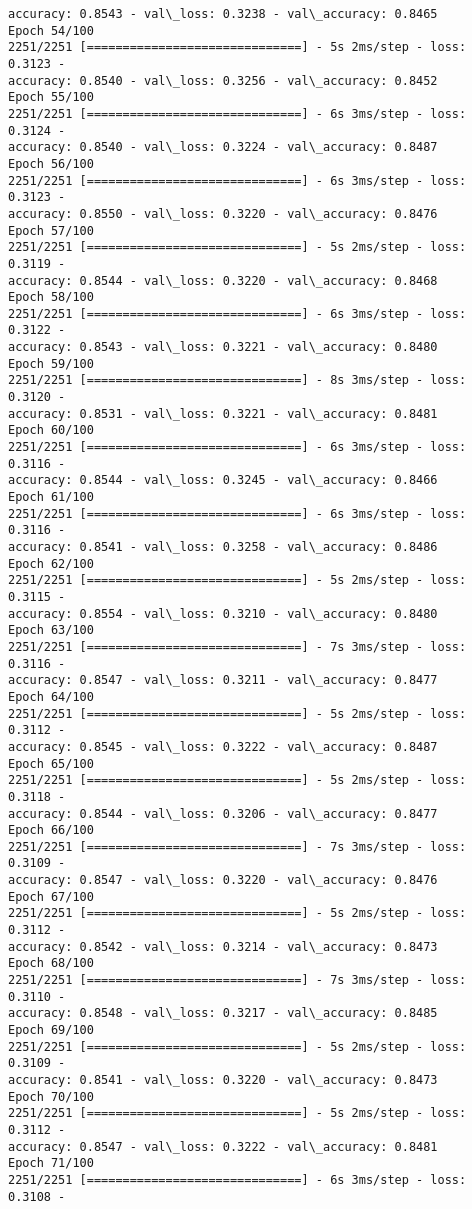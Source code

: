 \documentclass[11pt]{article}
\begin{document}
\begin{Verbatim}[commandchars=\\\{\}]
accuracy: 0.8543 - val\_loss: 0.3238 - val\_accuracy: 0.8465
Epoch 54/100
2251/2251 [==============================] - 5s 2ms/step - loss: 0.3123 -
accuracy: 0.8540 - val\_loss: 0.3256 - val\_accuracy: 0.8452
Epoch 55/100
2251/2251 [==============================] - 6s 3ms/step - loss: 0.3124 -
accuracy: 0.8540 - val\_loss: 0.3224 - val\_accuracy: 0.8487
Epoch 56/100
2251/2251 [==============================] - 6s 3ms/step - loss: 0.3123 -
accuracy: 0.8550 - val\_loss: 0.3220 - val\_accuracy: 0.8476
Epoch 57/100
2251/2251 [==============================] - 5s 2ms/step - loss: 0.3119 -
accuracy: 0.8544 - val\_loss: 0.3220 - val\_accuracy: 0.8468
Epoch 58/100
2251/2251 [==============================] - 6s 3ms/step - loss: 0.3122 -
accuracy: 0.8543 - val\_loss: 0.3221 - val\_accuracy: 0.8480
Epoch 59/100
2251/2251 [==============================] - 8s 3ms/step - loss: 0.3120 -
accuracy: 0.8531 - val\_loss: 0.3221 - val\_accuracy: 0.8481
Epoch 60/100
2251/2251 [==============================] - 6s 3ms/step - loss: 0.3116 -
accuracy: 0.8544 - val\_loss: 0.3245 - val\_accuracy: 0.8466
Epoch 61/100
2251/2251 [==============================] - 6s 3ms/step - loss: 0.3116 -
accuracy: 0.8541 - val\_loss: 0.3258 - val\_accuracy: 0.8486
Epoch 62/100
2251/2251 [==============================] - 5s 2ms/step - loss: 0.3115 -
accuracy: 0.8554 - val\_loss: 0.3210 - val\_accuracy: 0.8480
Epoch 63/100
2251/2251 [==============================] - 7s 3ms/step - loss: 0.3116 -
accuracy: 0.8547 - val\_loss: 0.3211 - val\_accuracy: 0.8477
Epoch 64/100
2251/2251 [==============================] - 5s 2ms/step - loss: 0.3112 -
accuracy: 0.8545 - val\_loss: 0.3222 - val\_accuracy: 0.8487
Epoch 65/100
2251/2251 [==============================] - 5s 2ms/step - loss: 0.3118 -
accuracy: 0.8544 - val\_loss: 0.3206 - val\_accuracy: 0.8477
Epoch 66/100
2251/2251 [==============================] - 7s 3ms/step - loss: 0.3109 -
accuracy: 0.8547 - val\_loss: 0.3220 - val\_accuracy: 0.8476
Epoch 67/100
2251/2251 [==============================] - 5s 2ms/step - loss: 0.3112 -
accuracy: 0.8542 - val\_loss: 0.3214 - val\_accuracy: 0.8473
Epoch 68/100
2251/2251 [==============================] - 7s 3ms/step - loss: 0.3110 -
accuracy: 0.8548 - val\_loss: 0.3217 - val\_accuracy: 0.8485
Epoch 69/100
2251/2251 [==============================] - 5s 2ms/step - loss: 0.3109 -
accuracy: 0.8541 - val\_loss: 0.3220 - val\_accuracy: 0.8473
Epoch 70/100
2251/2251 [==============================] - 5s 2ms/step - loss: 0.3112 -
accuracy: 0.8547 - val\_loss: 0.3222 - val\_accuracy: 0.8481
Epoch 71/100
2251/2251 [==============================] - 6s 3ms/step - loss: 0.3108 -

\end{Verbatim}
\end{document}
